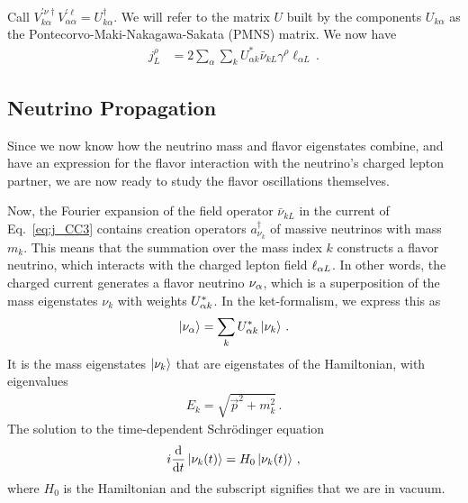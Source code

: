 Call $V^{\prime \nu \dagger}_{k \alpha}V^{\prime \ell}_{\alpha \alpha} = U^\dagger_{k \alpha}$. We will refer to the matrix $U$ built by the components $U_{k \alpha}$ as the
Pontecorvo-Maki-Nakagawa-Sakata (PMNS) matrix. %
We now have 
\begin{align}\label{eq:j_CC3} %
    j^\rho_L &= 2 \sum_\alpha \sum_k U^*_{\alpha k} \bar{\nu}_{k L} \gamma^\rho  \ell_{\alpha L}\,.
\end{align}
\subsection{Neutrino Propagation}
Since we now know how the neutrino mass and flavor eigenstates combine, and have an expression for the flavor interaction with 
the neutrino's charged lepton partner, we are now ready to study the flavor oscillations themselves.

Now, the Fourier expansion of the field operator $\bar{\nu}_{k L}$ in the current of Eq.~\ref{eq:j_CC3} contains creation operators $a^\dagger_{\nu_k}$
of massive neutrinos with mass $m_k$. This means that the summation over the mass index $k$ constructs a flavor neutrino, which interacts with the charged lepton field $\ell_{\alpha L}$.
In other words, the charged current generates a flavor neutrino $\nu_\alpha$, which is a superposition of the mass eigenstates 
$\nu_k$ with weights $U_{\alpha k}^*$. In the ket-formalism, we express this as
\begin{align}\label{eq:osc_1}
    \ket{\nu_\alpha} = \sum_k U^*_{\alpha k} \ket{\nu_k}\,.
\end{align}
It is the mass eigenstates $\ket{\nu_k}$ that are eigenstates of the Hamiltonian, with eigenvalues
\begin{align}\label{eq:disp}
    E_k = \sqrt{\vec{p}^2 + m_k^2}\,.
\end{align}
The solution to the time-dependent Schrödinger equation 
\begin{align}\label{eq:TDSE}
    i \dv{}{t} \ket{\nu_k(t)} = H_0\ket{\nu_k(t)}\,,
\end{align}
where $H_0$ is the Hamiltonian and the subscript signifies that we are in vacuum. 

